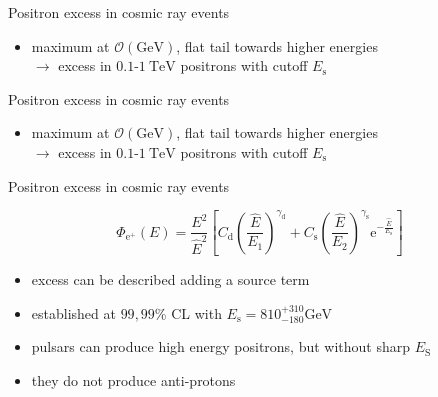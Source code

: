 \documentclass[11pt,a4paper,titlepage]{beamer}
\begin{document}
\begin{frame}{Positron excess in cosmic ray events}
\begin{minipage}{\textwidth}
\end{minipage}\vfill
\begin{minipage}{\textwidth}
\begin{itemize}
\item maximum at $\mathcal{O}(\si{\giga\eV})$, flat tail towards higher energies\\
$\rightarrow$ excess in $0.1$-$\SI{1}{\tera\eV}$ positrons with cutoff $E_\text{s}$
\end{itemize}
\end{minipage}
\end{frame}
\begin{frame}{Positron excess in cosmic ray events}
\begin{minipage}{\textwidth}
\end{minipage}\vfill
\begin{minipage}{\textwidth}
\begin{itemize}
\item maximum at $\mathcal{O}(\si{\giga\eV})$, flat tail towards higher energies\\
$\rightarrow$ excess in $0.1$-$\SI{1}{\tera\eV}$ positrons with cutoff $E_\text{s}$
\end{itemize}
\end{minipage}
\end{frame}
\begin{frame}{Positron excess in cosmic ray events}
\begin{minipage}{0.5\textwidth}
\end{minipage}
\begin{minipage}{0.4\textwidth}
\begin{tiny}
\[
\Phi_{\mathrm{e}^{+}}(E)=\frac{E^2}{\hat{E}^2}\left[C_\text{d}\left(\frac{\hat{E}}{E_\text{1}}\right)^{\gamma_\text{d}}+C_\text{s}\left(\frac{\hat{E}}{E_\text{2}}\right)^{\gamma_\text{s}}\mathrm{e}^{-\frac{\hat{E}}{E_\text{s}}}\right]
\]
\end{tiny}
\begin{itemize}
\item excess can be described adding a source term\medskip
\item established at $99,99\%$ CL with $E_\text{s}= 810^{+310}_{-180} \si{\giga\eV}$
\end{itemize}
\end{minipage}\vfill\pause
\begin{minipage}{\textwidth}
\begin{itemize}
\item pulsars can produce high energy positrons, but without sharp $E_\text{S}$\medskip
\item they do not produce anti-protons
\end{itemize}
\end{minipage}
\end{frame}
\end{document}
